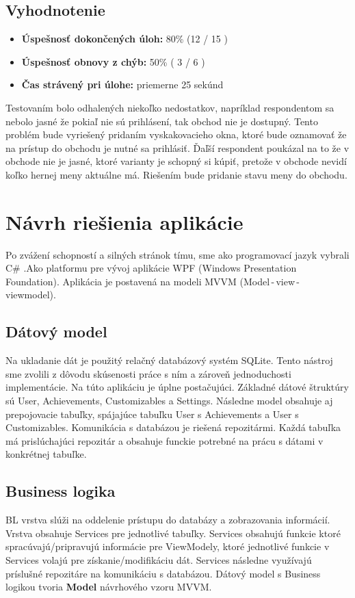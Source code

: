 \documentclass[a4paper, 11pt, onecolumn]{article}
\begin{document}
\subsection*{Vyhodnotenie}
\begin{itemize}
    \item \textbf{Úspešnosť dokončených úloh:} 80\% (12 / 15 )
    \item \textbf{Úspešnosť obnovy z chýb:} 50\% ( 3 / 6 )
    \item \textbf{Čas strávený pri úlohe:} priemerne 25 sekúnd 
\end{itemize}
Testovaním bolo odhalených niekoľko nedostatkov, napríklad respondentom sa nebolo jasné že pokiaľ nie sú prihlásení, tak 
obchod nie je dostupný. Tento problém bude vyriešený pridaním vyskakovacieho okna, ktoré bude oznamovať že na prístup do obchodu je nutné sa prihlásiť. 
Ďaľší respondent poukázal na to že v obchode nie je jasné, ktoré varianty je schopný si kúpiť, pretože v obchode nevidí koľko hernej meny aktuálne má.
Riešením bude pridanie stavu meny do obchodu.

\section{Návrh riešienia aplikácie}
Po zvážení schopností a silných stránok tímu, sme ako programovací jazyk vybrali C\# .Ako platformu pre vývoj aplikácie WPF (Windows Presentation Foundation).
Aplikácia je postavená na modeli MVVM (Model\,-\,view\,-\,viewmodel).

\subsection*{Dátový model}
Na ukladanie dát je použitý relačný databázový systém SQLite. Tento nástroj sme zvolili z dôvodu skúsenosti práce s ním a zároveň jednoduchosti implementácie.
Na túto aplikáciu je úplne postačujúci.
Základné dátové štruktúry sú User, Achievements, Customizables a Settings. Následne model obsahuje aj prepojovacie tabuľky, spájajúce tabuľku User s Achievements a User s Customizables.
Komunikácia s databázou je riešená repozitármi. Každá tabuľka má prislúchajúci repozitár a obsahuje funckie potrebné na prácu s dátami v konkrétnej tabuľke.

\subsection*{Business logika}
BL vrstva slúži na oddelenie prístupu do databázy a zobrazovania informácií. Vrstva obsahuje Services pre jednotlivé tabuľky. Services obsahujú funkcie ktoré spracúvajú/pripravujú informácie pre ViewModely,
ktoré jednotlivé funkcie v Services volajú  pre získanie/modifikáciu dát. Services následne využívajú príslušné repozitáre na komunikáciu s databázou.
Dátový model s Business logikou tvoria \textbf{Model} návrhového vzoru MVVM.
\end{document}
